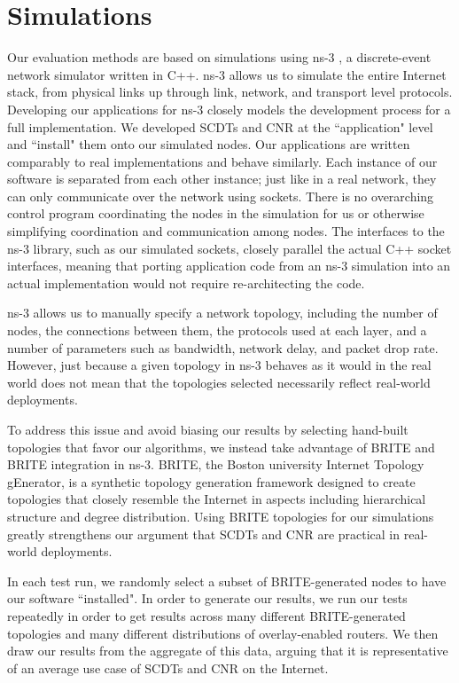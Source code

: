 \chapter{Simulations}
\label{simulations}
Our evaluation methods are based on simulations using ns-3 \cite{ns3}, a discrete-event network simulator written in C++. ns-3 allows us to simulate the entire Internet stack, from physical links up through link, network, and transport level protocols. Developing our applications for ns-3 closely models the development process for a full implementation. We developed SCDTs and CNR at the ``application" level and ``install" them onto our simulated nodes. Our applications are written comparably to real implementations and behave similarly. Each instance of our software is separated from each other instance; just like in a real network, they can only communicate over the network using sockets. There is no overarching control program coordinating the nodes in the simulation for us or otherwise simplifying coordination and communication among nodes. The interfaces to the ns-3 library, such as our simulated sockets, closely parallel the actual C++ socket interfaces, meaning that porting application code from an ns-3 simulation into an actual implementation would not require re-architecting the code.

ns-3 allows us to manually specify a network topology, including the number of nodes, the connections between them, the protocols used at each layer, and a number of parameters such as bandwidth, network delay, and packet drop rate. However, just because a given topology in ns-3 behaves as it would in the real world does not mean that the topologies selected necessarily reflect real-world deployments.

To address this issue and avoid biasing our results by selecting hand-built topologies that favor our algorithms, we instead take advantage of BRITE \cite{brite} and BRITE integration in ns-3. BRITE, the Boston university Internet Topology gEnerator, is a synthetic topology generation framework \cite{gtitm, inet} designed to create topologies that closely resemble the Internet in aspects including hierarchical structure and degree distribution. Using BRITE topologies for our simulations greatly strengthens our argument that SCDTs and CNR are practical in real-world deployments.

In each test run, we randomly select a subset of BRITE-generated nodes to have our software ``installed". In order to generate our results, we run our tests repeatedly in order to get results across many different BRITE-generated topologies and many different distributions of overlay-enabled routers. We then draw our results from the aggregate of this data, arguing that it is representative of an average use case of SCDTs and CNR on the Internet.

